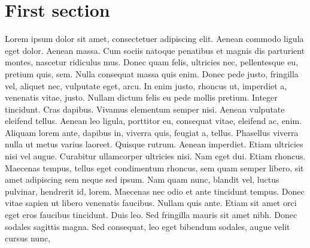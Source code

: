 \documentclass[11pt]{WSU_thesis}
\begin{document}
\section{First section}
Lorem ipsum dolor sit amet, consectetuer adipiscing elit. Aenean commodo ligula eget dolor. Aenean massa. Cum sociis natoque penatibus et magnis dis parturient montes, nascetur ridiculus mus. Donec quam felis, ultricies nec, pellentesque eu, pretium quis, sem. Nulla consequat massa quis enim. Donec pede justo, fringilla vel, aliquet nec, vulputate eget, arcu. In enim justo, rhoncus ut, imperdiet a, venenatis vitae, justo. Nullam dictum felis eu pede mollis pretium. Integer tincidunt. Cras dapibus. Vivamus elementum semper nisi. Aenean vulputate eleifend tellus. Aenean leo ligula, porttitor eu, consequat vitae, eleifend ac, enim. Aliquam lorem ante, dapibus in, viverra quis, feugiat a, tellus. Phasellus viverra nulla ut metus varius laoreet. Quisque rutrum. Aenean imperdiet. Etiam ultricies nisi vel augue. Curabitur ullamcorper ultricies nisi. Nam eget dui. Etiam rhoncus. Maecenas tempus, tellus eget condimentum rhoncus, sem quam semper libero, sit amet adipiscing sem neque sed ipsum. Nam quam nunc, blandit vel, luctus pulvinar, hendrerit id, lorem. Maecenas nec odio et ante tincidunt tempus. Donec vitae sapien ut libero venenatis faucibus. Nullam quis ante. Etiam sit amet orci eget eros faucibus tincidunt. Duis leo. Sed fringilla mauris sit amet nibh. Donec sodales sagittis magna. Sed consequat, leo eget bibendum sodales, augue velit cursus nunc,

\begin{references}


\end{references}
\end{document}
